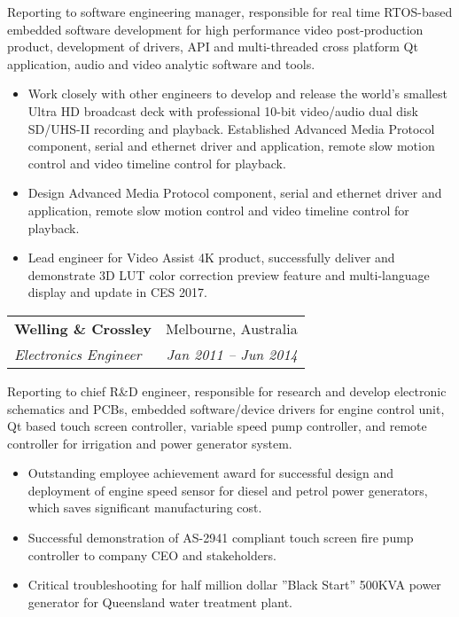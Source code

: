\documentclass[letterpaper,11pt]{article}
\makeatletter
\newcommand{\resumeItemNoBullet}[4]{
  \vspace{-1pt}
    \begin{tabular*}{0.97\textwidth}{l@{\extracolsep{\fill}}r}
      \textbf{#1} & #2 \\
      \textit{\small#3} & \textit{\small #4} \\
    \end{tabular*}\vspace{-7pt}
}
\newcommand{\resumeSubHeadingListStart}{\begin{itemize}[leftmargin=*]}
\newcommand{\resumeSubHeadingListEnd}{\end{itemize}}
\makeatother
\begin{document}
\vspace{10pt}
{Reporting to software engineering manager, responsible for real time RTOS-based embedded software development for high performance video post-production product, development of drivers, API and multi-threaded cross platform Qt application, audio and video analytic software and tools.}
  \resumeSubHeadingListStart
    \item Work closely with other engineers to develop and release the world’s smallest Ultra HD broadcast deck with professional 10-bit video/audio dual disk SD/UHS-II recording and playback. Established Advanced Media Protocol component, serial and ethernet driver and application, remote slow motion control and video timeline control for playback.
    \item Design Advanced Media Protocol component, serial and ethernet driver and application, remote slow motion control and video timeline control for playback.
    \item Lead engineer for Video Assist 4K product, successfully deliver and demonstrate 3D LUT color correction preview feature and multi-language display and update in CES 2017.
  \resumeSubHeadingListEnd

\resumeItemNoBullet
{Welling \& Crossley}{Melbourne, Australia}
{Electronics Engineer}{Jan 2011 -- Jun 2014}

\vspace{10pt}
{ Reporting to chief R\&D engineer, responsible for research and develop electronic schematics and PCBs, embedded software/device drivers for engine control unit, Qt based touch screen controller, variable speed pump controller, and remote controller for irrigation and power generator system. }
  \resumeSubHeadingListStart
    \item Outstanding employee achievement award for successful design and deployment of engine speed sensor for diesel and petrol power generators, which saves significant manufacturing cost.
    \item Successful demonstration of AS-2941 compliant touch screen fire pump controller to company CEO and stakeholders. 
    \item Critical troubleshooting for half million dollar ”Black Start” 500KVA power generator for Queensland water treatment plant. 
  \resumeSubHeadingListEnd

\end{document}
